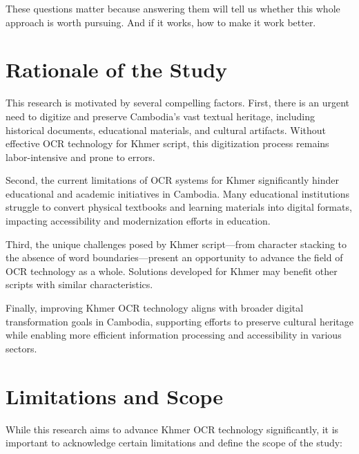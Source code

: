 These questions matter because answering them will tell us whether this whole approach is worth pursuing. And if it works, how to make it work better.

\section{Rationale of the Study}
\label{sec:rationale}
       This research is motivated by several compelling factors. First, there is an urgent need to digitize and preserve Cambodia's vast textual heritage, including historical documents, educational materials, and cultural artifacts. Without effective OCR technology for Khmer script, this digitization process remains labor-intensive and prone to errors.

Second, the current limitations of OCR systems for Khmer significantly hinder educational and academic initiatives in Cambodia. Many educational institutions struggle to convert physical textbooks and learning materials into digital formats, impacting accessibility and modernization efforts in education.

Third, the unique challenges posed by Khmer script—from character stacking to the absence of word boundaries—present an opportunity to advance the field of OCR technology as a whole. Solutions developed for Khmer may benefit other scripts with similar characteristics.

Finally, improving Khmer OCR technology aligns with broader digital transformation goals in Cambodia, supporting efforts to preserve cultural heritage while enabling more efficient information processing and accessibility in various sectors.

\section{Limitations and Scope}
\label{sec:limitations}

While this research aims to advance Khmer OCR technology significantly, it is important to acknowledge certain limitations and define the scope of the study:

